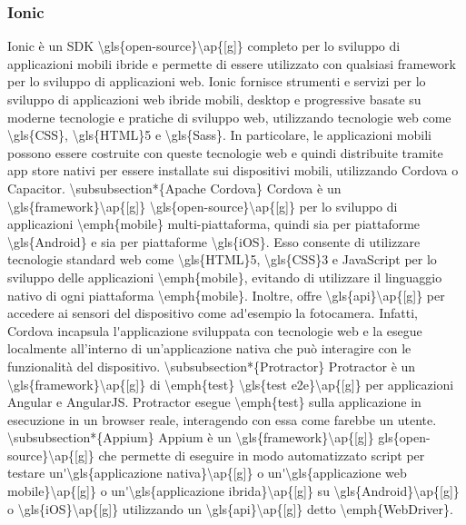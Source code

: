 \subsubsection*{Ionic}
Ionic è un \gls{SDK \gls{open-source}\ap{[g]} completo per lo sviluppo di applicazioni mobili ibride e permette di essere utilizzato con qualsiasi framework per lo sviluppo di applicazioni web. Ionic fornisce strumenti e servizi per lo sviluppo di applicazioni web ibride mobili, desktop e progressive basate su moderne tecnologie e pratiche di sviluppo web, utilizzando tecnologie web come \gls{CSS}, \gls{HTML}5 e \gls{Sass}. In particolare, le applicazioni mobili possono essere costruite con queste tecnologie web e quindi distribuite tramite app store nativi per essere installate sui dispositivi mobili, utilizzando Cordova o Capacitor. 

\subsubsection*{Apache Cordova}
Cordova è un \gls{framework}\ap{[g]} \gls{open-source}\ap{[g]} per lo sviluppo di applicazioni \emph{mobile} multi-piattaforma, quindi sia per piattaforme \gls{Android} e sia per piattaforme \gls{iOS}. Esso consente di utilizzare tecnologie standard web come \gls{HTML}5, \gls{CSS}3 e JavaScript per lo sviluppo delle applicazioni \emph{mobile}, evitando di utilizzare il linguaggio nativo di ogni piattaforma \emph{mobile}. Inoltre, offre \gls{api}\ap{[g]} per accedere ai sensori del dispositivo come ad'esempio la fotocamera. Infatti, Cordova incapsula l'applicazione sviluppata con tecnologie web e la esegue localmente all’interno di un’applicazione nativa che può interagire con le funzionalità del dispositivo.

\subsubsection*{Protractor}
Protractor è un \gls{framework}\ap{[g]} di \emph{test} \gls{test e2e}\ap{[g]} per applicazioni Angular e AngularJS. Protractor esegue \emph{test} sulla applicazione in esecuzione in un browser reale, interagendo con essa come farebbe un utente.

\subsubsection*{Appium}
Appium è un \gls{framework}\ap{[g]} gls{open-source}\ap{[g]} che permette di eseguire in modo automatizzato script per testare un'\gls{applicazione nativa}\ap{[g]} o un'\gls{applicazione web mobile}\ap{[g]} o un'\gls{applicazione ibrida}\ap{[g]} su \gls{Android}\ap{[g]} o \gls{iOS}\ap{[g]} utilizzando un \gls{api}\ap{[g]} detto \emph{WebDriver}.

}
